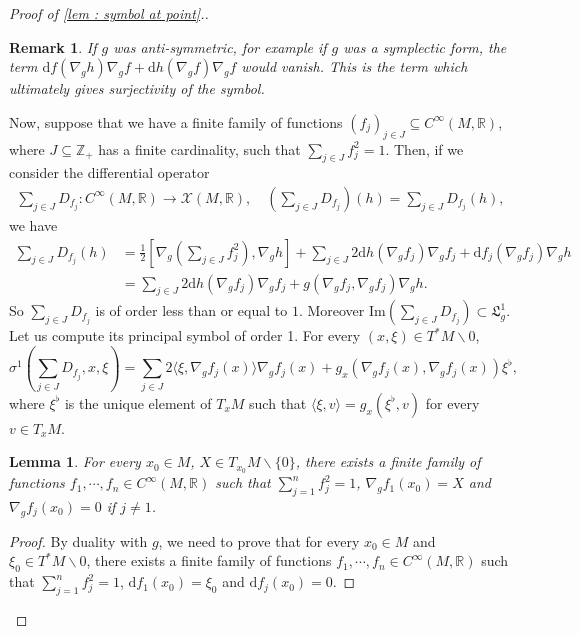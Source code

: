 \documentclass[10pt]{article}
\newcommand{\la}{\langle}
\newcommand{\ra}{\rangle}
\newcommand{\R}{{\mathbb R}}
\newcommand{\Z}{{\mathbb Z}}
\newcommand{\Chi}{{\mathcal X}}
\newcommand{\LL}{{\mathfrak L}}
\newtheorem{lemma}{Lemma}
\newtheorem{rem}{Remark}
\begin{document}
\begin{proof}[Proof of \cref{lem : symbol at point}.]
    \begin{rem}
        If $g$ was anti-symmetric, for example if $g$ was a symplectic form, the term $\mathrm{d}f(\nabla_gh)\nabla_gf+\mathrm{d}h(\nabla_gf)\nabla_gf$ would vanish. This is the term which ultimately gives surjectivity of the symbol.
    \end{rem}
    Now, suppose that we have a finite family of functions $(f_j)_{j\in J}\subseteq C^{\infty}(M,\R)$, where $J\subseteq \Z_+$ has a finite cardinality, such that $\sum_{j\in J}f_j^2=1$.
    Then, if we consider the differential operator
    \begin{equation*}\begin{aligned}
            \sum_{j\in J}D_{f_j}: C^{\infty}(M,\R)\rightarrow\Chi(M,\R),\quad (\sum_{j\in J}D_{f_j})(h)=\sum_{j\in J}D_{f_j}(h),
        \end{aligned}\end{equation*}
    we have
    \begin{align*}
        \sum_{j\in J}D_{f_j}(h) & =\frac{1}{2}[\nabla_g\left(\sum_{j\in J}f_j^2\right),\nabla_gh]+\sum_{j\in J}2\mathrm{d}h(\nabla_gf_j)\nabla_gf_j+\mathrm{d}f_j(\nabla_gf_j)\nabla_gh \\
                            & =\sum_{j\in J}2\mathrm{d}h(\nabla_gf_j)\nabla_gf_j+g(\nabla_gf_j,\nabla_gf_j)\nabla_gh.
    \end{align*}
    So $\sum_{j\in J}D_{f_j}$ is of order less than or equal to $1$. Moreover $\mathrm{Im}(\sum_{j\in J}D_{f_j})\subset \LL_g^1$. Let us compute its principal symbol of order 1. For every $(x,\xi)\in T^*M\backslash 0$,
    \begin{equation*}
        \sigma^1(\sum_{j\in J}D_{f_j},x,\xi)=\sum_{j\in J}2\la \xi, \nabla_g f_j(x)\ra\nabla_g f_j(x)+g_x(\nabla_g f_j(x),\nabla_g f_j(x))\xi^{\flat},
    \end{equation*}
    where $\xi^\flat$ is the unique element of $T_xM$ such that $\la \xi,v\ra=g_x(\xi^\flat,v)$ for every $v\in T_xM$.
    \begin{lemma}\label{lemma : parition}
        For every $x_0\in M$, $X\in T_{x_0}M\backslash \{0\}$, there exists a finite family of functions $f_1,\cdots,f_n\in C^\infty(M,\R)$ such that $\sum_{j=1}^nf_j^2=1$, $\nabla_gf_1(x_0)=X$ and $\nabla_gf_j(x_0)=0$ if $j\neq1$.
    \end{lemma}
    \begin{proof}
        By duality with $g$, we need to prove that for every $x_0\in M$ and $\xi_0\in T^*M\backslash 0$,
        there exists a finite family of functions $f_1,\cdots,f_n\in C^\infty(M,\R)$ such that $\sum_{j=1}^nf_j^2=1$, $\mathrm{d}f_1(x_0)=\xi_0$ and $\mathrm{d}f_j(x_0)=0$.

\end{proof}
\end{proof}
\end{document}
